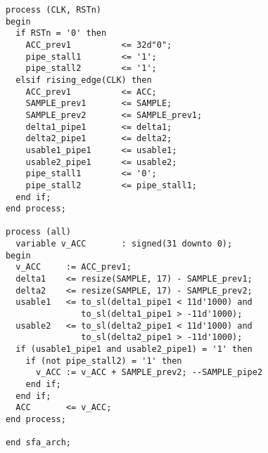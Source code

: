\begin{table*}[t!]
\begin{minipage}[t][22cm][t]{0.51\linewidth}
\begin{verbatim}
      process (CLK, RSTn)
      begin
        if RSTn = '0' then
          ACC_prev1          <= 32d"0";
          pipe_stall1        <= '1';     
          pipe_stall2        <= '1';
        elsif rising_edge(CLK) then
          ACC_prev1          <= ACC;
          SAMPLE_prev1       <= SAMPLE;  
          SAMPLE_prev2       <= SAMPLE_prev1;
          delta1_pipe1       <= delta1;  
          delta2_pipe1       <= delta2;
          usable1_pipe1      <= usable1; 
          usable2_pipe1      <= usable2;
          pipe_stall1        <= '0';     
          pipe_stall2        <= pipe_stall1;
        end if;
      end process;
      
      process (all)
        variable v_ACC       : signed(31 downto 0);
      begin
        v_ACC     := ACC_prev1;
        delta1    <= resize(SAMPLE, 17) - SAMPLE_prev1;
        delta2    <= resize(SAMPLE, 17) - SAMPLE_prev2;
        usable1   <= to_sl(delta1_pipe1 < 11d'1000) and 
                     to_sl(delta1_pipe1 > -11d'1000);
        usable2   <= to_sl(delta2_pipe1 < 11d'1000) and 
                     to_sl(delta2_pipe1 > -11d'1000);
        if (usable1_pipe1 and usable2_pipe1) = '1' then
          if (not pipe_stall2) = '1' then
            v_ACC := v_ACC + SAMPLE_prev2; --SAMPLE_pipe2
          end if;
        end if;
        ACC       <= v_ACC;
      end process;
      
      end sfa_arch;
    \end{verbatim}
    \label{fig:FP_Compare_Graph}
  \end{minipage}
\end{table*}

